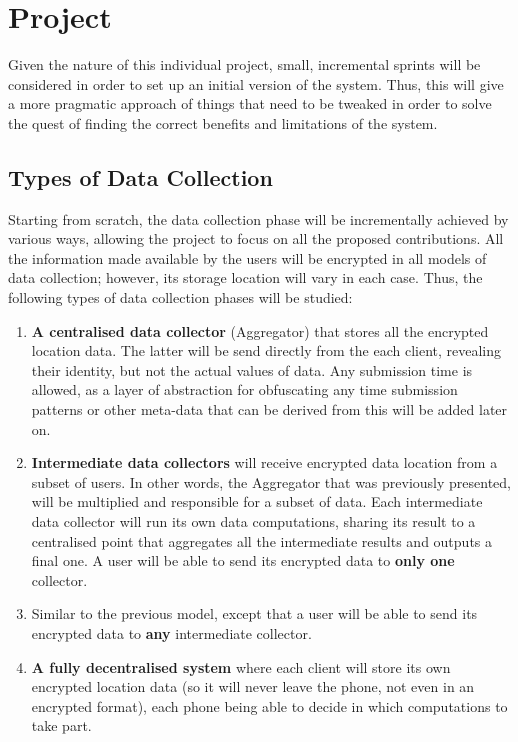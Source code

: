 \chapter{Project}

Given the nature of this individual project, small, incremental sprints will be considered in order to set up an initial version of the system. Thus, this will give a more pragmatic approach of things that need to be tweaked in order to solve the quest of finding the correct benefits and limitations of the system.

\section{Types of Data Collection}
Starting from scratch, the data collection phase will be incrementally achieved by various ways, allowing the project to focus on all the proposed contributions. 
All the information made available by the users will be encrypted in all models of data collection; however, its storage location will vary in each case. Thus, the following types of data collection phases will be studied:
\begin{enumerate}
\item \textbf{A centralised data collector} (Aggregator) that stores all the encrypted location data. The latter will be send directly from the each client, revealing their identity, but not the actual values of data. Any submission time is allowed, as a layer of abstraction for obfuscating any time submission patterns or other meta-data that can be derived from this will be added later on.

\item \textbf{Intermediate data collectors} will receive encrypted data location from a subset of users. In other words, the Aggregator that was previously presented, will be multiplied and responsible for a subset of data. Each intermediate data collector will run its own data computations, sharing its result to a centralised point that aggregates all the intermediate results and outputs a final one. A user will be able to send its encrypted data to \textbf{only one} collector.

\item Similar to the previous model, except that a user will be able to send its encrypted data to \textbf{any} intermediate collector. 

\item \textbf{A fully decentralised system} where each client will store its own encrypted location data (so it will never leave the phone, not even in an encrypted format), each phone being able to decide in which computations to take part.
\end{enumerate}

